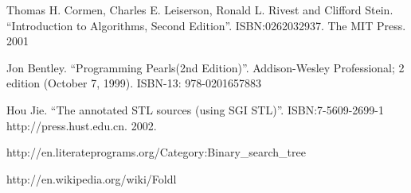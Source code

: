 \documentclass{article}
\begin{document}
\begin{thebibliography}{99}

Thomas H. Cormen, Charles E. Leiserson, Ronald L. Rivest and Clifford Stein. 
``Introduction to Algorithms, Second Edition''. ISBN:0262032937. The MIT Press. 2001

Jon Bentley. ``Programming Pearls(2nd Edition)''. Addison-Wesley Professional; 2 edition (October 7, 1999). ISBN-13: 978-0201657883

Hou Jie. ``The annotated STL sources (using SGI STL)''. ISBN:7-5609-2699-1 http://press.hust.edu.cn. 2002.

http://en.literateprograms.org/Category:Binary\_search\_tree

http://en.wikipedia.org/wiki/Foldl

\end{thebibliography}

\ifx\wholebook\relax\else
\end{document}
